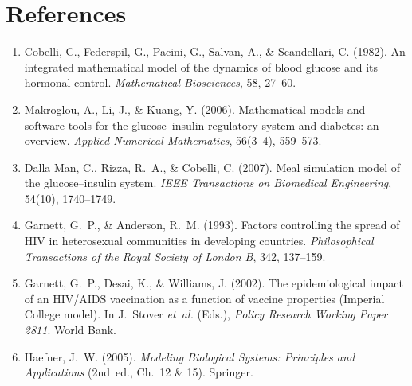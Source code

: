 \documentclass[11pt]{article}
\begin{document}
\section{References}
\small
\begin{enumerate}[leftmargin=1.4em,itemsep=1pt]
\item Cobelli, C., Federspil, G., Pacini, G., Salvan, A., \& Scandellari, C. (1982). An integrated
mathematical model of the dynamics of blood glucose and its hormonal control. \emph{Mathematical
Biosciences}, 58, 27--60.
\item Makroglou, A., Li, J., \& Kuang, Y. (2006). Mathematical models and software tools for the
glucose--insulin regulatory system and diabetes: an overview. \emph{Applied Numerical Mathematics},
56(3--4), 559--573.
\item Dalla Man, C., Rizza, R.~A., \& Cobelli, C. (2007). Meal simulation model of the
glucose--insulin system. \emph{IEEE Transactions on Biomedical Engineering}, 54(10), 1740--1749.
\item Garnett, G.~P., \& Anderson, R.~M. (1993). Factors controlling the spread of HIV in
heterosexual communities in developing countries. \emph{Philosophical Transactions of the Royal
Society of London B}, 342, 137--159.
\item Garnett, G.~P., Desai, K., \& Williams, J. (2002). The epidemiological impact of an HIV/AIDS
vaccination as a function of vaccine properties (Imperial College model). In J.~Stover \emph{et~al.}
(Eds.), \emph{Policy Research Working Paper 2811}. World Bank.
\item Haefner, J.~W. (2005). \emph{Modeling Biological Systems: Principles and Applications}
(2nd~ed., Ch.~12 \& 15). Springer.
\end{enumerate}
\end{document}
